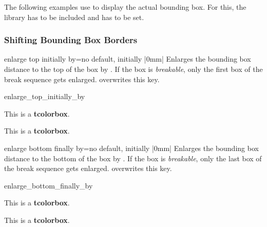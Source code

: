 \begin{marker}
The following examples use  to display the
actual bounding box. For this, the library  has to be included and
 has to be set.
\end{marker}

\subsubsection{Shifting Bounding Box Borders}

\begin{docTcbKey}{enlarge top initially by}{=}{no default, initially |0mm|}
  Enlarges the bounding box distance to the top of the box by .
  If the box is \emph{breakable}, only the first box of the break sequence
  gets enlarged.  overwrites this key.
\begin{exdispExample}{enlarge_top_initially_by}

\begin{tcolorbox}[enlarge top initially by=-5mm]
This is a \textbf{tcolorbox}.
\end{tcolorbox}
\begin{tcolorbox}[enlarge top initially by=5mm,enhanced,show bounding box]
This is a \textbf{tcolorbox}.
\end{tcolorbox}
\end{exdispExample}
\end{docTcbKey}



\begin{docTcbKey}{enlarge bottom finally by}{=}{no default, initially |0mm|}
  Enlarges the bounding box distance to the bottom of the box by .
  If the box is \emph{breakable}, only the last box of the break sequence
  gets enlarged.  overwrites this key.
\begin{exdispExample}{enlarge_bottom_finally_by}

\begin{tcolorbox}[enlarge bottom finally by=5mm]
This is a \textbf{tcolorbox}.
\end{tcolorbox}
\begin{tcolorbox}[enlarge bottom finally by=-5mm,enhanced,show bounding box]
This is a \textbf{tcolorbox}.
\end{tcolorbox}
\end{exdispExample}
\end{docTcbKey}

